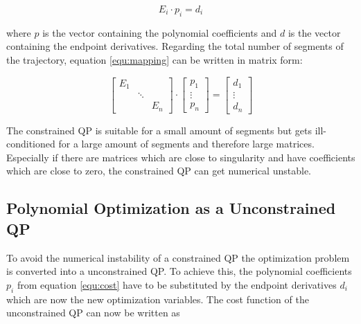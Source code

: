 \begin{equation}
E_i \cdot p_i = d_i
\label{equ:mapping}
\end{equation}

where $p$ is the vector containing the polynomial coefficients and $d$ is the vector containing the endpoint derivatives. Regarding the total number of segments of the trajectory, equation \ref{equ:mapping} can be written in matrix form:

\begin{equation}
\begin{bmatrix}
   E_1 &  &  \\
    & \ddots &  \\
   & & E_n
\end{bmatrix} 
\cdot
\begin{bmatrix}
   p_1 \\
\vdots \\
  p_n
\end{bmatrix}
=
\begin{bmatrix}
   d_1 \\
\vdots \\
  d_n
\end{bmatrix}
\end{equation} 

The constrained QP is suitable for a small amount of segments but gets ill-conditioned for a large amount of segments and therefore large matrices. Especially if there are matrices which are close to singularity and have coefficients which are close to zero, the constrained QP can get numerical unstable.

\subsection{Polynomial Optimization as a Unconstrained QP}\label{sec:polynomialQP}

To avoid the numerical instability of a constrained QP the optimization problem is converted into a unconstrained QP. To achieve this, the polynomial coefficients $p_i$ from equation \ref{equ:cost} have to be substituted by the endpoint derivatives $d_i$ which are now the new optimization variables. The cost function of the unconstrained QP can now be written as 

